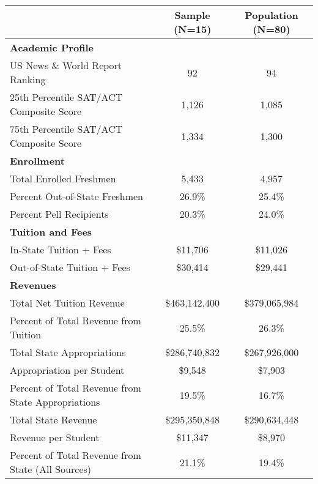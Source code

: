 \begin{tabular*}{\textwidth}{@{\extracolsep{\fill} } lcc}%
&\textbf{Sample} (N=15)&\textbf{Population} (N=80)\\%
\hline%
\multicolumn{3}{l}{\bfseries Academic Profile}\\%
\hspace{0.2cm}US News \& World Report Ranking&92&94\\%
\hspace{0.2cm}25th Percentile SAT/ACT Composite Score&1,126&1,085\\%
\hspace{0.2cm}75th Percentile SAT/ACT Composite Score&1,334&1,300\\%
\multicolumn{3}{l}{\bfseries Enrollment}\\%
\hspace{0.2cm}Total Enrolled Freshmen&5,433&4,957\\%
\hspace{0.2cm}Percent Out{-}of{-}State Freshmen&26.9\%&25.4\%\\%
\hspace{0.2cm}Percent Pell Recipients&20.3\%&24.0\%\\%
\multicolumn{3}{l}{\bfseries Tuition and Fees}\\%
\hspace{0.2cm}In{-}State Tuition + Fees&\$11,706&\$11,026\\%
\hspace{0.2cm}Out{-}of{-}State Tuition + Fees&\$30,414&\$29,441\\%
\multicolumn{3}{l}{\bfseries Revenues}\\%
\hspace{0.2cm}Total Net Tuition Revenue&\$463,142,400&\$379,065,984\\%
\hspace{0.2cm}Percent of Total Revenue from Tuition&25.5\%&26.3\%\\%
\hspace{0.2cm}Total State Appropriations&\$286,740,832&\$267,926,000\\%
\hspace{0.2cm}Appropriation per Student&\$9,548&\$7,903\\%
\hspace{0.2cm}Percent of Total Revenue from State Appropriations&19.5\%&16.7\%\\%
\hspace{0.2cm}Total State Revenue&\$295,350,848&\$290,634,448\\%
\hspace{0.2cm}Revenue per Student&\$11,347&\$8,970\\%
\hspace{0.2cm}Percent of Total Revenue from State (All Sources)&21.1\%&19.4\%\\%
\hline%
\end{tabular*}